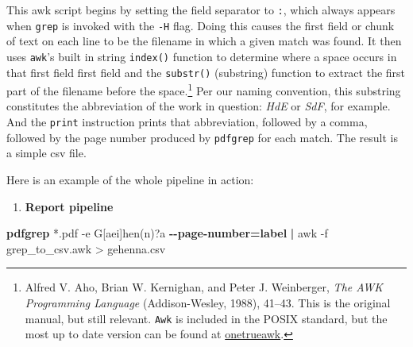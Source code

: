 \documentclass[
  letterpaper,
]{tufte-handout}
\newenvironment{Shaded}{\begin{snugshade}}{\end{snugshade}}
\newcommand{\AttributeTok}[1]{\textcolor[rgb]{0.00,0.34,0.68}{#1}}
\newcommand{\BuiltInTok}[1]{\textcolor[rgb]{0.39,0.29,0.61}{\textbf{#1}}}
\newcommand{\CommentTok}[1]{\textcolor[rgb]{0.54,0.53,0.53}{#1}}
\newcommand{\ControlFlowTok}[1]{\textcolor[rgb]{0.12,0.11,0.11}{\textbf{#1}}}
\newcommand{\DataTypeTok}[1]{\textcolor[rgb]{0.00,0.34,0.68}{#1}}
\newcommand{\DecValTok}[1]{\textcolor[rgb]{0.69,0.50,0.00}{#1}}
\newcommand{\ExtensionTok}[1]{\textcolor[rgb]{0.00,0.58,1.00}{\textbf{#1}}}
\newcommand{\FunctionTok}[1]{\textcolor[rgb]{0.39,0.29,0.61}{#1}}
\newcommand{\KeywordTok}[1]{\textcolor[rgb]{0.12,0.11,0.11}{\textbf{#1}}}
\newcommand{\NormalTok}[1]{\textcolor[rgb]{0.12,0.11,0.11}{#1}}
\newcommand{\OperatorTok}[1]{\textcolor[rgb]{0.12,0.11,0.11}{#1}}
\newcommand{\PreprocessorTok}[1]{\textcolor[rgb]{0.00,0.43,0.16}{#1}}
\newcommand{\StringTok}[1]{\textcolor[rgb]{0.75,0.01,0.01}{#1}}
\providecommand{\tightlist}{%
  \setlength{\itemsep}{0pt}\setlength{\parskip}{0pt}}
\begin{document}
\begin{Shaded}
\end{Shaded}

This awk script begins by setting the field separator to \texttt{:},
which always appears when \texttt{grep} is invoked with the \texttt{-H}
flag. Doing this causes the first field or chunk of text on each line to
be the filename in which a given match was found. It then uses
\texttt{awk}'s built in string \texttt{index()} function to determine
where a space occurs in that first field first field and the
\texttt{substr()} (substring) function to extract the first part of the
filename before the space.\footnote{Alfred V. Aho, Brian W. Kernighan,
  and Peter J. Weinberger, \emph{The AWK Programming Language}
  (Addison-Wesley, 1988), 41--43. This is the original manual, but still
  relevant. \texttt{Awk} is included in the POSIX standard, but the most
  up to date version can be found at
  \href{https://github.com/onetrueawk/awk}{onetrueawk}.} Per our naming
convention, this substring constitutes the abbreviation of the work in
question: \emph{HdE} or \emph{SdF}, for example. And the \texttt{print}
instruction prints that abbreviation, followed by a comma, followed by
the page number produced by \texttt{pdfgrep} for each match. The result
is a simple csv file.

Here is an example of the whole pipeline in action:

\begin{enumerate}
\def\labelenumi{(\arabic{enumi})}
\setcounter{enumi}{8}
\tightlist
\item
  \textbf{Report pipeline}
\end{enumerate}

\begin{Shaded}
\begin{Highlighting}[]
 \ExtensionTok{pdfgrep} \PreprocessorTok{*}\NormalTok{.pdf }\AttributeTok{{-}e} \StringTok{\textquotesingle{}G[aei]hen(n)?a\textquotesingle{}}
  \ExtensionTok{{-}{-}page{-}number=label}  \KeywordTok{|} \FunctionTok{awk} \AttributeTok{{-}f}\NormalTok{ grep\_to\_csv.awk }\OperatorTok{\textgreater{}}\NormalTok{ gehenna.csv}
\end{Highlighting}
\end{Shaded}
\end{document}
